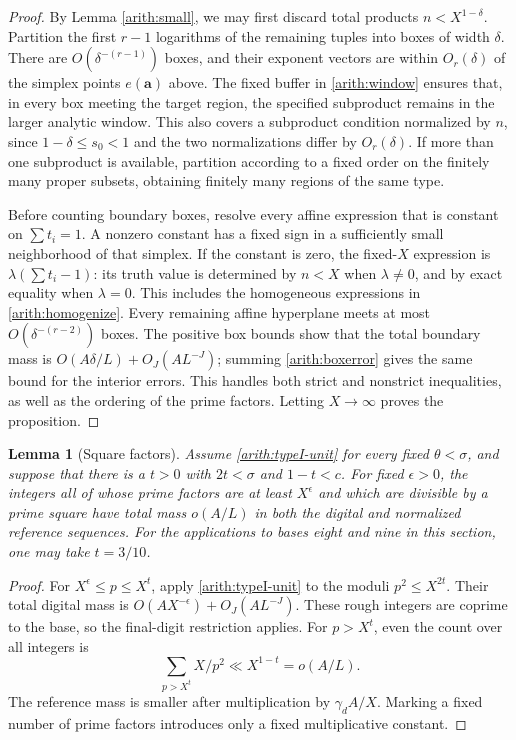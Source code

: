\documentclass[11pt,a4paper]{article}
\theoremstyle{paperplain}
\newtheorem{lemma}[theorem]{Lemma}
\numberwithin{equation}{section}
\begin{document}
\begin{proof}
By Lemma \ref{arith:small}, we may first discard total products
$n<X^{1-\delta}$. Partition the first $r-1$ logarithms of the remaining
tuples into boxes of width $\delta$.
There are $O(\delta^{-(r-1)})$ boxes, and their exponent vectors are
within $O_r(\delta)$ of the simplex points $e(\boldsymbol a)$ above.
The fixed buffer in \eqref{arith:window} ensures that, in every box
meeting the target region, the specified subproduct remains in the
larger analytic window. This also covers a subproduct condition
normalized by $n$, since $1-\delta\le s_0<1$ and the two
normalizations differ by $O_r(\delta)$.
If more than one subproduct is available, partition according to a
fixed order on the finitely many proper subsets, obtaining finitely
many regions of the same type.

Before counting boundary boxes, resolve every affine expression
that is constant on $\sum t_i=1$.
A nonzero constant has a fixed sign in a sufficiently small
neighborhood of that simplex. If the constant is zero, the
fixed-$X$ expression is $\lambda(\sum t_i-1)$: its truth value is
determined by $n<X$ when $\lambda\ne0$, and by exact equality when
$\lambda=0$. This includes the homogeneous expressions in
\eqref{arith:homogenize}.
Every remaining affine hyperplane meets at most
$O(\delta^{-(r-2)})$ boxes.
The positive box bounds show that the total boundary mass is
$O(A\delta/L)+O_J(AL^{-J})$; summing \eqref{arith:boxerror} gives the
same bound for the interior errors.
This handles both strict and nonstrict inequalities, as well as the
ordering of the prime factors.
Letting $X\to\infty$ proves the proposition.
\end{proof}

\begin{lemma}[Square factors]\label{arith:squarefree}
Assume \eqref{arith:typeI-unit} for every fixed $\theta<\sigma$,
and suppose that there is a $t>0$ with $2t<\sigma$ and $1-t<c$.
For fixed $\epsilon>0$, the integers all of whose prime factors are
at least $X^\epsilon$ and which are divisible by a prime square have
total mass $o(A/L)$ in both the digital and normalized reference
sequences.
For the applications to bases eight and nine in this section, one
may take $t=3/10$.
\end{lemma}
\begin{proof}
For $X^\epsilon\le p\le X^t$, apply \eqref{arith:typeI-unit} to the
moduli $p^2\le X^{2t}$. Their total digital mass is
$O(AX^{-\epsilon})+O_J(AL^{-J})$.
These rough integers are coprime to the base, so the final-digit
restriction applies.
For $p>X^t$, even the count over all integers is
\[
 \sum_{p>X^t}X/p^2\ll X^{1-t}=o(A/L).
\]
The reference mass is smaller after multiplication by
$\gamma_dA/X$. Marking a fixed number of prime factors introduces
only a fixed multiplicative constant.
\end{proof}
\end{document}
